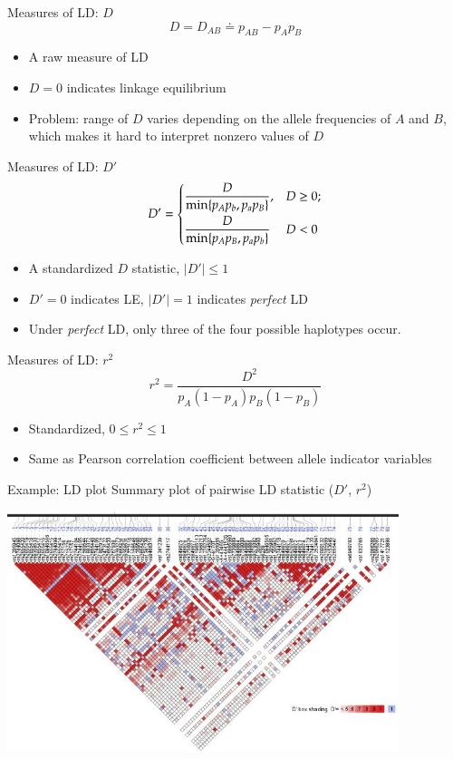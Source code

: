 \documentclass[serif,mathserif,professionalfonts,svgnames]{beamer}
\providecommand{\abs}[1]{\lvert#1\rvert}
\begin{document}
\begin{frame}{Measures of LD: $D$}
  $$D = D_{AB} \doteq p_{AB}-p_A p_B$$

\begin{itemize}
\item A raw measure of LD
\item $D=0$ indicates linkage equilibrium
\item Problem: range of $D$ varies depending on the allele frequencies of $A$
  and $B$, which makes it hard to interpret nonzero values of $D$
\end{itemize}
\end{frame}

\begin{frame}{Measures of LD: $D'$}
  $$D' = 
  \begin{cases}
    \dfrac{D}{\min\{p_A p_b, p_a p_B \}}, & D \geq 0; \smallskip \\ 
    \dfrac{D}{\min\{p_A p_B, p_a p_b \}}  & D < 0
  \end{cases}
  $$
  \begin{itemize}
  \item A standardized $D$ statistic, $\abs{D'} \leq 1$
  \item $D'=0$ indicates LE, $\abs{D'}=1$ indicates \emph{perfect} LD
  \item Under \emph{perfect} LD, only three of the four possible
    haplotypes occur.
  \end{itemize}
\end{frame}

\begin{frame}{Measures of LD: $r^2$}
  $$r^2 = \frac{D^2}{p_A (1-p_A) p_B (1-p_B)}$$
 \begin{itemize}
  \item Standardized, $0 \leq r^2 \leq 1$
  \item Same as Pearson correlation coefficient between allele
    indicator variables
 \end{itemize}
\end{frame}


\begin{frame}{Example: LD plot}
  Summary plot of pairwise LD statistic ($D'$, $r^2$) 
 \begin{center}
    \includegraphics[width=4.5in]{ld-plot.jpg}
  \end{center}
\end{frame}
\end{document}
